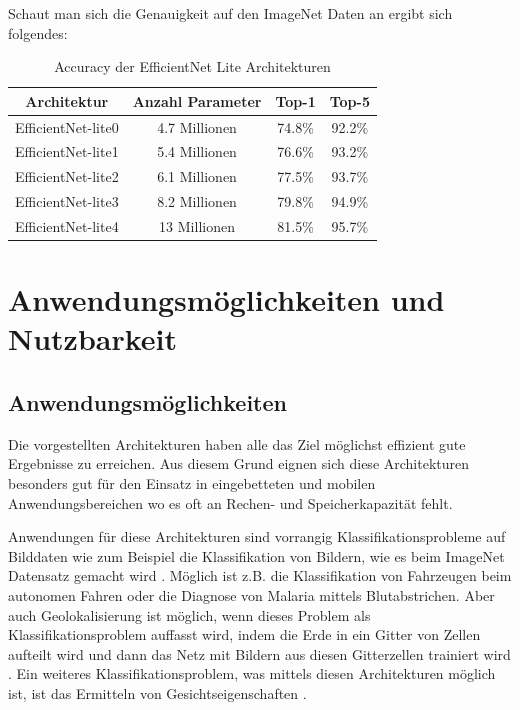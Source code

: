 \documentclass[conference]{IEEEtran}
\begin{document}
Schaut man sich die Genauigkeit auf den ImageNet Daten \cite{b3} an ergibt sich folgendes:

\begin{table}[htbp]
\caption{Accuracy der EfficientNet Lite Architekturen \cite{b4}}
\begin{center}
\begin{tabular}{|c|c|c|c|}
\hline
Architektur     & Anzahl Parameter & Top-1  & Top-5  \\
\hline
EfficientNet-lite0 & 4.7 Millionen    & 74.8\% & 92.2\% \\
EfficientNet-lite1 & 5.4 Millionen    & 76.6\% & 93.2\% \\
EfficientNet-lite2 & 6.1 Millionen    & 77.5\% & 93.7\% \\
EfficientNet-lite3 & 8.2 Millionen    & 79.8\% & 94.9\% \\
EfficientNet-lite4 & 13 Millionen     & 81.5\% & 95.7\% \\
\hline
\end{tabular}
\end{center}
\end{table}


\section{Anwendungsmöglichkeiten und Nutzbarkeit}

\subsection{Anwendungsmöglichkeiten}
Die vorgestellten Architekturen haben alle das Ziel möglichst effizient gute Ergebnisse zu erreichen. Aus diesem Grund eignen sich diese Architekturen besonders gut für den Einsatz in eingebetteten und mobilen Anwendungsbereichen wo es oft an Rechen- und Speicherkapazität fehlt.

Anwendungen für diese Architekturen sind vorrangig Klassifikationsprobleme auf Bilddaten wie zum Beispiel die Klassifikation von Bildern, wie es beim ImageNet Datensatz gemacht wird \cite{b3}.
Möglich ist z.B. die Klassifikation von Fahrzeugen beim autonomen Fahren oder die Diagnose von Malaria mittels Blutabstrichen.
Aber auch Geolokalisierung ist möglich, wenn dieses Problem als Klassifikationsproblem auffasst wird, indem die Erde in ein Gitter von Zellen aufteilt wird und dann das Netz mit Bildern aus diesen Gitterzellen trainiert wird \cite{b9}. Ein weiteres Klassifikationsproblem, was mittels diesen Architekturen möglich ist, ist das Ermitteln von Gesichtseigenschaften \cite{b9}.
\end{document}
